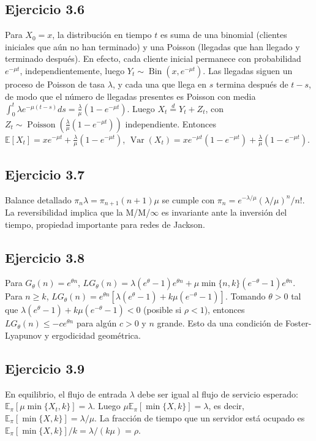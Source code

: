\documentclass[letterpaper, 12pt]{article}
\newcommand{\E}{\mathbb{E}}
\newcommand{\1}{\mathbbm{1}}
\DeclareMathOperator{\Var}{Var}
\DeclareMathOperator{\Poisson}{Poisson}
\DeclareMathOperator{\Bin}{Bin}
\begin{document}
    \subsection{Ejercicio 3.6}
    Para $X_0=x$, la distribuci\'on en tiempo $t$ es suma de una binomial (clientes iniciales que a\'un no han terminado) y una Poisson (llegadas que han llegado y terminado despu\'es). En efecto, cada cliente inicial permanece con probabilidad $e^{-\mu t}$, independientemente, luego $Y_t\sim\Bin(x,e^{-\mu t})$. Las llegadas siguen un proceso de Poisson de tasa $\lambda$, y cada una que llega en $s$ termina despu\'es de $t-s$, de modo que el n\'umero de llegadas presentes es Poisson con media $\int_0^t\lambda e^{-\mu(t-s)}ds=\frac{\lambda}{\mu}(1-e^{-\mu t})$. Luego $X_t\stackrel{d}{=}Y_t+Z_t$, con $Z_t\sim\Poisson(\frac{\lambda}{\mu}(1-e^{-\mu t}))$ independiente. Entonces $\E[X_t]=xe^{-\mu t}+\frac{\lambda}{\mu}(1-e^{-\mu t})$, $\Var(X_t)=xe^{-\mu t}(1-e^{-\mu t})+\frac{\lambda}{\mu}(1-e^{-\mu t})$.

    \subsection{Ejercicio 3.7}
    Balance detallado $\pi_n\lambda=\pi_{n+1}(n+1)\mu$ se cumple con $\pi_n=e^{-\lambda/\mu}(\lambda/\mu)^n/n!$. La reversibilidad implica que la M/M/$\infty$ es invariante ante la inversi\'on del tiempo, propiedad importante para redes de Jackson.

    \subsection{Ejercicio 3.8}
    Para $G_\theta(n)=e^{\theta n}$, $LG_\theta(n)=\lambda(e^{\theta}-1)e^{\theta n}+\mu\min\{n,k\}(e^{-\theta}-1)e^{\theta n}$. Para $n\ge k$, $LG_\theta(n)=e^{\theta n}[\lambda(e^{\theta}-1)+k\mu(e^{-\theta}-1)]$. Tomando $\theta>0$ tal que $\lambda(e^{\theta}-1)+k\mu(e^{-\theta}-1)<0$ (posible si $\rho<1$), entonces $LG_\theta(n)\le -c e^{\theta n}$ para alg\'un $c>0$ y $n$ grande. Esto da una condici\'on de Foster-Lyapunov y ergodicidad geom\'etrica.

    \subsection{Ejercicio 3.9}
    En equilibrio, el flujo de entrada $\lambda$ debe ser igual al flujo de servicio esperado: $\E_\pi[\mu\min\{X_t,k\}]=\lambda$. Luego $\mu\E_\pi[\min\{X,k\}]=\lambda$, es decir, $\E_\pi[\min\{X,k\}]=\lambda/\mu$. La fracci\'on de tiempo que un servidor est\'a ocupado es $\E_\pi[\min\{X,k\}]/k=\lambda/(k\mu)=\rho$.
\end{document}

